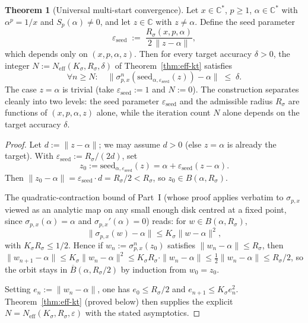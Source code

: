 \documentclass[11pt,a4paper]{article}
\theoremstyle{definition}
\newtheorem{theorem}{Theorem}[section]
\begin{document}
\begin{theorem}[Universal multi-start convergence]\label{thm:multistart}
Let $x \in \mathbb{C}^\ast$, $p \geq 1$, $\alpha \in \mathbb{C}^\ast$ with
$\alpha^p = 1/x$ and $S_p(\alpha) \neq 0$, and let $z \in \mathbb{C}$ with
$z \neq \alpha$. Define the seed parameter
\[
  \varepsilon_{\mathrm{seed}} \;:=\; \frac{R_\sigma(x,p,\alpha)}{2\,\|z - \alpha\|},
\]
which depends only on $(x, p, \alpha, z)$. Then for every target accuracy
$\delta > 0$, the integer
$N := N_{\mathrm{eff}}(K_\sigma, R_\sigma, \delta)$ of
Theorem~\ref{thm:eff-kt} satisfies
\[
  \forall n \geq N: \quad
  \big\|\sigma_{p,x}^n(\mathrm{seed}_{\alpha, \varepsilon_{\mathrm{seed}}}(z))
        - \alpha\big\| \;\leq\; \delta.
\]
The case $z = \alpha$ is trivial (take $\varepsilon_{\mathrm{seed}} := 1$ and
$N := 0$). The construction separates cleanly into two levels: the seed
parameter $\varepsilon_{\mathrm{seed}}$ and the admissible radius $R_\sigma$
are functions of $(x, p, \alpha, z)$ alone, while the iteration count $N$
alone depends on the target accuracy $\delta$.
\end{theorem}

\begin{proof}
Let $d := \|z - \alpha\|$; we may assume $d > 0$ (else $z = \alpha$ is already the target). With $\varepsilon_{\mathrm{seed}} := R_\sigma/(2d)$, set
\[
  z_0 := \mathrm{seed}_{\alpha, \varepsilon_{\mathrm{seed}}}(z) = \alpha + \varepsilon_{\mathrm{seed}}(z - \alpha).
\]
Then $\|z_0 - \alpha\| = \varepsilon_{\mathrm{seed}}\cdot d = R_\sigma/2 < R_\sigma$, so $z_0 \in B(\alpha, R_\sigma)$.

The quadratic-contraction bound of Part~I (whose proof applies verbatim to $\sigma_{p,x}$ viewed as an analytic map on any small enough disk centred at a fixed point, since $\sigma_{p,x}(\alpha) = \alpha$ and $\sigma_{p,x}'(\alpha) = 0$) reads: for $w \in B(\alpha, R_\sigma)$,
\[
  \|\sigma_{p,x}(w) - \alpha\| \leq K_\sigma \|w - \alpha\|^2,
\]
with $K_\sigma R_\sigma \leq 1/2$. Hence if $w_n := \sigma_{p,x}^n(z_0)$ satisfies $\|w_n - \alpha\| \leq R_\sigma$, then
$\|w_{n+1} - \alpha\| \leq K_\sigma \|w_n - \alpha\|^2 \leq K_\sigma R_\sigma \cdot \|w_n - \alpha\| \leq \tfrac12 \|w_n - \alpha\| \leq R_\sigma/2$,
so the orbit stays in $\overline{B}(\alpha, R_\sigma/2)$ by induction from $w_0 = z_0$.

Setting $e_n := \|w_n - \alpha\|$, one has $e_0 \leq R_\sigma/2$ and $e_{n+1} \leq K_\sigma e_n^2$. Theorem~\ref{thm:eff-kt} (proved below) then supplies the explicit $N = N_{\mathrm{eff}}(K_\sigma, R_\sigma, \varepsilon)$ with the stated asymptotics.
\end{proof}
\end{document}
